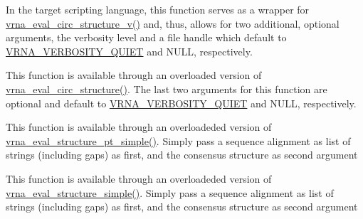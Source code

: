 \begin{DoxyRefList}
\item[\label{wrappers__wrappers000036}%
\Hypertarget{wrappers__wrappers000036}%
Global \mbox{\hyperlink{group__eval_ga3e05a23ddf9b083f4e69881e440d4866}{vrna\+\_\+eval\+\_\+circ\+\_\+structure}} (const char $\ast$string, const char $\ast$structure)]In the target scripting language, this function serves as a wrapper for \mbox{\hyperlink{group__eval_gac3fb44e0773a51be8efc5f4f595a94a7}{vrna\+\_\+eval\+\_\+circ\+\_\+structure\+\_\+v()}} and, thus, allows for two additional, optional arguments, the verbosity level and a file handle which default to \mbox{\hyperlink{eval_8h_af4afe19780b61b4962c613bde324128b}{V\+R\+N\+A\+\_\+\+V\+E\+R\+B\+O\+S\+I\+T\+Y\+\_\+\+Q\+U\+I\+ET}} and N\+U\+LL, respectively.  
\item[\label{wrappers__wrappers000046}%
\Hypertarget{wrappers__wrappers000046}%
Global \mbox{\hyperlink{group__eval_gac3fb44e0773a51be8efc5f4f595a94a7}{vrna\+\_\+eval\+\_\+circ\+\_\+structure\+\_\+v}} (const char $\ast$string, const char $\ast$structure, int verbosity\+\_\+level, F\+I\+LE $\ast$file)]This function is available through an overloaded version of \mbox{\hyperlink{group__eval_ga3e05a23ddf9b083f4e69881e440d4866}{vrna\+\_\+eval\+\_\+circ\+\_\+structure()}}. The last two arguments for this function are optional and default to \mbox{\hyperlink{eval_8h_af4afe19780b61b4962c613bde324128b}{V\+R\+N\+A\+\_\+\+V\+E\+R\+B\+O\+S\+I\+T\+Y\+\_\+\+Q\+U\+I\+ET}} and N\+U\+LL, respectively.  
\item[\label{wrappers__wrappers000054}%
\Hypertarget{wrappers__wrappers000054}%
Global \mbox{\hyperlink{group__eval_gabbb4d2a7aa324ec9cce8f47ce61ab8af}{vrna\+\_\+eval\+\_\+consensus\+\_\+structure\+\_\+pt\+\_\+simple}} (const char $\ast$$\ast$alignment, const short $\ast$pt)]This function is available through an overloadeded version of \mbox{\hyperlink{group__eval_ga0bba59b4d6e53461088666ff4aece7b0}{vrna\+\_\+eval\+\_\+structure\+\_\+pt\+\_\+simple()}}. Simply pass a sequence alignment as list of strings (including gaps) as first, and the consensus structure as second argument  
\item[\label{wrappers__wrappers000039}%
\Hypertarget{wrappers__wrappers000039}%
Global \mbox{\hyperlink{group__eval_ga7762c3a7bdcbc3a14ef93259d322c7d6}{vrna\+\_\+eval\+\_\+consensus\+\_\+structure\+\_\+simple}} (const char $\ast$$\ast$alignment, const char $\ast$structure)]This function is available through an overloadeded version of \mbox{\hyperlink{group__eval_ga7e5273464b775d4130245681312c1369}{vrna\+\_\+eval\+\_\+structure\+\_\+simple()}}. Simply pass a sequence alignment as list of strings (including gaps) as first, and the consensus structure as second argument  

\end{DoxyRefList}
